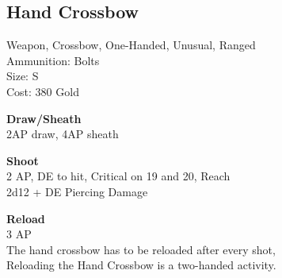 \subsection{Hand Crossbow}\label{weapon:handCrossbow}
Weapon, Crossbow, One-Handed, Unusual, Ranged\\
Ammunition: Bolts\\
Size: S\\
Cost: 380 Gold

\textbf{Draw/Sheath} \\
2AP draw, 4AP sheath

\textbf{Shoot} \\
2 AP, DE to hit, Critical on 19 and 20,  Reach\\
2d12 + \texttimes DE Piercing Damage

\textbf{Reload} \\
3 AP\\
The hand crossbow has to be reloaded after every shot,\\
Reloading the Hand Crossbow is a two-handed activity.

